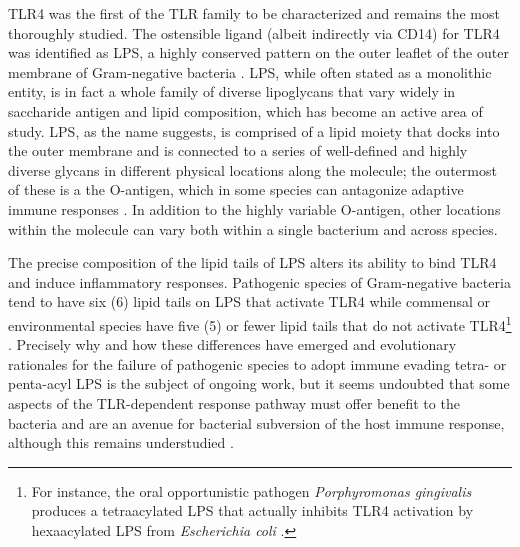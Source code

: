 TLR4 was the first of the TLR family to be characterized and remains the most thoroughly studied. The ostensible ligand (albeit indirectly via CD14) for TLR4 was identified as LPS, a highly conserved pattern on the outer leaflet of the outer membrane of Gram-negative bacteria \citep{Wright1990, Guha2001, Shi2014, Kagayaki2013}. LPS, while often stated as a monolithic entity, is in fact a whole family of diverse lipoglycans that vary widely in saccharide antigen and lipid composition, which has become an active area of study. LPS, as the name suggests, is comprised of a lipid moiety that docks into the outer membrane and is connected to a series of well-defined and highly diverse glycans in different physical locations along the molecule; the outermost of these is a the O-antigen, which in some species can antagonize adaptive immune responses \citep{DominguezMedina2020}. In addition to the highly variable O-antigen, other locations within the molecule can vary both within a single bacterium and across species.

The precise composition of the lipid tails of LPS alters its ability to bind  TLR4 and induce inflammatory responses. Pathogenic species of Gram-negative bacteria tend to have six (6) lipid tails on LPS that activate TLR4 while commensal or environmental species have five (5) or fewer lipid tails that do not activate TLR4\footnote{For instance, the oral opportunistic pathogen \textit{Porphyromonas gingivalis} produces a tetraacylated LPS that actually inhibits TLR4 activation by hexaacylated LPS from \textit{Escherichia coli} \citep{Zhang2008, Darveau2004, Herath2013}.} \citep{Leeber2010, Gyorfy2013, Tan2015, Simpson2019}. Precisely why and how these differences have emerged and evolutionary rationales for the failure of pathogenic species to adopt immune evading tetra- or penta-acyl LPS is the subject of ongoing work, but it seems undoubted that some aspects of the TLR-dependent response pathway must offer benefit to the bacteria and are an avenue for bacterial subversion of the host immune response, although this remains understudied \citep{Park2013, McGuire2015}.

